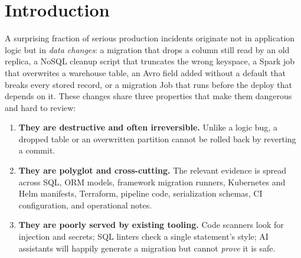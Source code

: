 \documentclass[11pt]{article}
\newcommand{\tool}{\textsc{Patchline}}
\newcommand{\code}[1]{\texttt{#1}}
\begin{document}
\begin{abstract}
infrastructure/data ordering, a research-grade evaluation methodology that includes blinded
false-positive adjudication, seeded false-negative recall, ablations, standardized effect sizes, and
severity calibration against independent danger evidence, and---layered on top---an end-to-end
\emph{trust stack}: signed provenance chains, reproducible-build attestation, Merkle audit logs,
external replication kits, and artifact-evaluation hygiene (datasheets, model cards, preregistration,
and a reproducibility appendix) that each ship as their own falsifiable gate. Two further hundreds of
gates push the methodology further still---toward mechanized formal foundations, planet-scale evidence,
a definitive causal/field evaluation design, trustworthy autonomy, definitional adoption surfaces, and a
learned-but-checkable research frontier---each, again, expressed as a falsifiable gate with a
positive proof and a negative control. We describe \tool's design principles,
architecture, breadth of analysis, intervention-safety model, runtime/observability evidence
integration, and reproducibility methodology, and we report results on real repositories including
\code{lobsters/lobsters}, \code{apache/avro}, \code{helm/charts}, and a multi-framework lakehouse.
\end{abstract}

\tableofcontents
\bigskip

\section{Introduction}

A surprising fraction of serious production incidents originate not in application logic but in
\emph{data changes}: a migration that drops a column still read by an old replica, a NoSQL cleanup
script that truncates the wrong keyspace, a Spark job that overwrites a warehouse table, an Avro
field added without a default that breaks every stored record, or a migration Job that runs before
the deploy that depends on it. These changes share three properties that make them dangerous and
hard to review:

\begin{enumerate}[leftmargin=1.4em]
  \item \textbf{They are destructive and often irreversible.} Unlike a logic bug, a dropped table or
  an overwritten partition cannot be rolled back by reverting a commit.
  \item \textbf{They are polyglot and cross-cutting.} The relevant evidence is spread across SQL,
  ORM models, framework migration runners, Kubernetes and Helm manifests, Terraform, pipeline code,
  serialization schemas, CI configuration, and operational notes.
  \item \textbf{They are poorly served by existing tooling.} Code scanners look for injection and
  secrets; SQL linters check a single statement's style; AI assistants will happily generate a
  migration but cannot \emph{prove} it is safe.
\end{enumerate}
\end{document}
